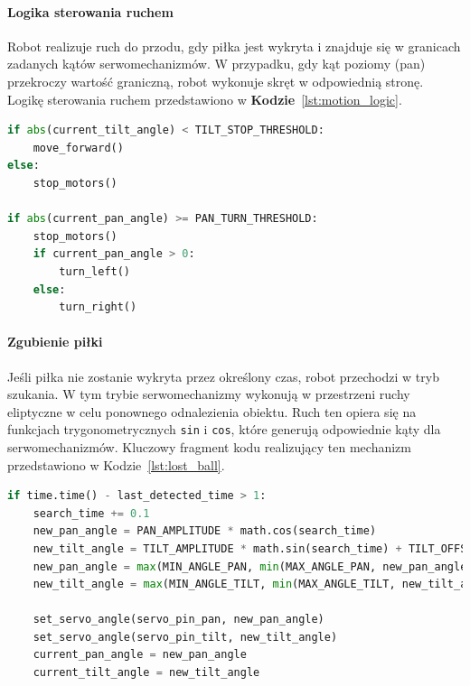 \documentclass[a4paper,twoside,12pt]{book}
\begin{document}
\paragraph{Logika sterowania ruchem}
Robot realizuje ruch do przodu, gdy piłka jest wykryta i znajduje się w granicach zadanych kątów serwomechanizmów. W przypadku, gdy kąt poziomy (pan) przekroczy wartość graniczną, robot wykonuje skręt w odpowiednią stronę. Logikę sterowania ruchem przedstawiono w \textbf{Kodzie}~\ref{lst:motion_logic}.

\begin{lstlisting}[language=Python, caption={Logika sterowania ruchem robota.}, label={lst:motion_logic}, captionpos=b]
if abs(current_tilt_angle) < TILT_STOP_THRESHOLD:
    move_forward()
else:
    stop_motors()

if abs(current_pan_angle) >= PAN_TURN_THRESHOLD:
    stop_motors()
    if current_pan_angle > 0:
        turn_left()
    else:
        turn_right()
\end{lstlisting}

\paragraph{Zgubienie piłki}
Jeśli piłka nie zostanie wykryta przez określony czas, robot przechodzi w tryb szukania. W tym trybie serwomechanizmy wykonują w przestrzeni ruchy eliptyczne w celu ponownego odnalezienia obiektu. Ruch ten opiera się na funkcjach trygonometrycznych \texttt{sin} i \texttt{cos}, które generują odpowiednie kąty dla serwomechanizmów. Kluczowy fragment kodu realizujący ten mechanizm przedstawiono w Kodzie~\ref{lst:lost_ball}.

\begin{lstlisting}[language=Python, caption={Logika zgubienia piłki i ruchu eliptycznego.}, label={lst:lost_ball}, captionpos=b]
if time.time() - last_detected_time > 1:
    search_time += 0.1
    new_pan_angle = PAN_AMPLITUDE * math.cos(search_time)
    new_tilt_angle = TILT_AMPLITUDE * math.sin(search_time) + TILT_OFFSET
    new_pan_angle = max(MIN_ANGLE_PAN, min(MAX_ANGLE_PAN, new_pan_angle))
    new_tilt_angle = max(MIN_ANGLE_TILT, min(MAX_ANGLE_TILT, new_tilt_angle))

    set_servo_angle(servo_pin_pan, new_pan_angle)
    set_servo_angle(servo_pin_tilt, new_tilt_angle)
    current_pan_angle = new_pan_angle
    current_tilt_angle = new_tilt_angle
\end{lstlisting}
\end{document}
